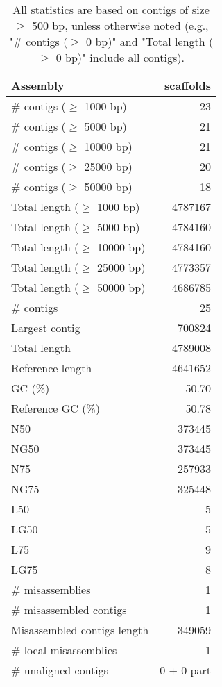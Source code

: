 \documentclass[12pt,a4paper]{article}
\begin{document}
\begin{table}[ht]
\begin{center}
\caption{All statistics are based on contigs of size $\geq$ 500 bp, unless otherwise noted (e.g., "\# contigs ($\geq$ 0 bp)" and "Total length ($\geq$ 0 bp)" include all contigs).}
\begin{tabular}{|l*{1}{|r}|}
\hline
Assembly & scaffolds \\ \hline
\# contigs ($\geq$ 1000 bp) & 23 \\ \hline
\# contigs ($\geq$ 5000 bp) & 21 \\ \hline
\# contigs ($\geq$ 10000 bp) & 21 \\ \hline
\# contigs ($\geq$ 25000 bp) & 20 \\ \hline
\# contigs ($\geq$ 50000 bp) & 18 \\ \hline
Total length ($\geq$ 1000 bp) & 4787167 \\ \hline
Total length ($\geq$ 5000 bp) & 4784160 \\ \hline
Total length ($\geq$ 10000 bp) & 4784160 \\ \hline
Total length ($\geq$ 25000 bp) & 4773357 \\ \hline
Total length ($\geq$ 50000 bp) & 4686785 \\ \hline
\# contigs & 25 \\ \hline
Largest contig & 700824 \\ \hline
Total length & 4789008 \\ \hline
Reference length & 4641652 \\ \hline
GC (\%) & 50.70 \\ \hline
Reference GC (\%) & 50.78 \\ \hline
N50 & 373445 \\ \hline
NG50 & 373445 \\ \hline
N75 & 257933 \\ \hline
NG75 & 325448 \\ \hline
L50 & 5 \\ \hline
LG50 & 5 \\ \hline
L75 & 9 \\ \hline
LG75 & 8 \\ \hline
\# misassemblies & 1 \\ \hline
\# misassembled contigs & 1 \\ \hline
Misassembled contigs length & 349059 \\ \hline
\# local misassemblies & 1 \\ \hline
\# unaligned contigs & 0 + 0 part \\ \hline

\end{tabular}
\end{center}
\end{table}
\end{document}
